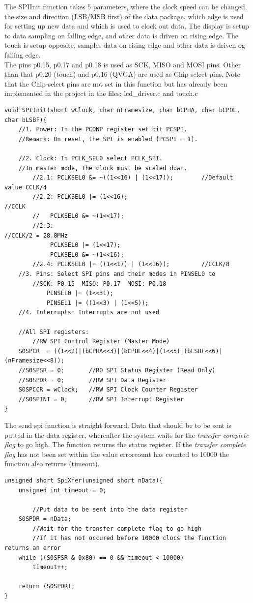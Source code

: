 The SPIInit function takes 5 parameters, where the clock speed can be changed, the size and direction (LSB/MSB first) of the data package,
which edge is used for setting up new data and which is used to clock out data.
The display is setup to data sampling on falling edge, and other data is driven on rising edge. The touch is setup opposite, samples data on rising edge and other data 
is driven og falling edge.
\\ The pins p0.15, p0.17 and p0.18 is used as SCK, MISO and MOSI pins. Other than that p0.20 (touch) and p0.16 (QVGA) are used as Chip-select pins. 
Note that the Chip-select pins are not set in this function but has already been implemented in the project in the files: 
lcd\_driver.c and touch.c
\begin{lstlisting}
void SPIInit(short wClock, char nFramesize, char bCPHA, char bCPOL, char bLSBF){
	//1. Power: In the PCONP register set bit PCSPI.
	//Remark: On reset, the SPI is enabled (PCSPI = 1).

	//2. Clock: In PCLK_SEL0 select PCLK_SPI.
	//In master mode, the clock must be scaled down.
		//2.1: PCLKSEL0 &= ~((1<<16) | (1<<17));		//Default value CCLK/4
		//2.2: PCLKSEL0 |= (1<<16);									//CCLK
		//   PCLKSEL0 &= ~(1<<17);
		//2.3:																			//CCLK/2 = 28.8MHz
			 PCLKSEL0 |= (1<<17);
			 PCLKSEL0 &= ~(1<<16);
		//2.4: PCLKSEL0 |= ((1<<17) | (1<<16)); 		//CCLK/8
	//3. Pins: Select SPI pins and their modes in PINSEL0 to
		//SCK: P0.15  MISO: P0.17  MOSI: P0.18
			PINSEL0 |= (1<<31);
			PINSEL1 |= ((1<<3) | (1<<5));
	//4. Interrupts: Interrupts are not used

	//All SPI registers:
		//RW SPI Control Register (Master Mode)
	S0SPCR	= ((1<<2)|(bCPHA<<3)|(bCPOL<<4)|(1<<5)|(bLSBF<<6)|(nFramesize<<8));
	//S0SPSR = 0;		//RO SPI Status Register (Read Only)
	//S0SPDR = 0;		//RW SPI Data Register
	S0SPCCR = wClock;	//RW SPI Clock Counter Register
	//S0SPINT = 0;		//RW SPI Interrupt Register
}
\end{lstlisting}
The send spi function is straight forward. Data that should be to be sent is putted in the data register, whereafter the system waits for the 
\textit{transfer complete flag} to go high. The function returns the status register. If the \textit{transfer complete flag} has not been set within 
the value errorcount has counted to 10000 the function also returns (timeout).
\begin{lstlisting}
unsigned short SpiXfer(unsigned short nData){
	unsigned int timeout = 0;

		//Put data to be sent into the data register
	S0SPDR = nData;
		//Wait for the transfer complete flag to go high
		//If it has not occured before 10000 clocs the function returns an error
	while ((S0SPSR & 0x80) == 0 && timeout < 10000)
		timeout++;

	return (S0SPDR);
}
\end{lstlisting}
\newpage
